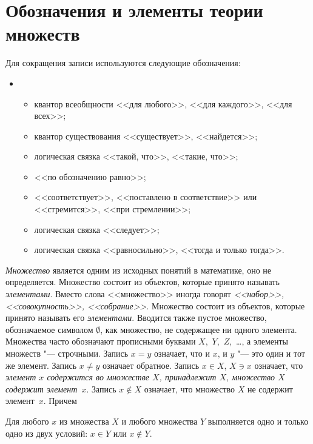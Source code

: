\chapter{Обозначения и элементы теории множеств}

Для сокращения записи используются следующие обозначения:
\begin{itemize}
\item[]
\begin{itemize}[noitemsep, label = ---]
\item \makebox[0pt][r]{$\forall$\hspace{0.75cm}}
квантор всеобщности <<для любого>>, <<для каждого>>, <<для всех>>;
\item \makebox[0pt][r]{$\exists$\hspace{0.75cm}}
квантор существования  <<существует>>, <<найдется>>;
\item \makebox[0pt][r]{$:$\hspace{0.75cm}}
логическая связка <<такой, что>>, <<такие, что>>;
\item \makebox[0pt][r]{$\triangleq$\hspace{0.75cm}} 
<<по обозначению равно>>;
\item \makebox[0pt][r]{$\to$\hspace{0.75cm}}
<<соответствует>>, <<поставлено в соответствие>> или <<стремится>>, <<при стремлении>>;
\item \makebox[0pt][r]{$\Rightarrow$\hspace{0.75cm}}
логическая связка <<следует>>;
\item \makebox[0pt][r]{$\Longleftrightarrow$\hspace{0.75cm}}
логическая связка <<равносильно>>, <<тогда и только тогда>>.
\end{itemize}
\end{itemize}

\textit{Множество} является одним из исходных понятий в математике, оно не определяется. Множество состоит из объектов, которые принято называть \textit{элементами}. Вместо слова <<множество>> иногда говорят \textit{<<набор>>, <<совокупность>>, <<собрание>>}. Множество состоит из объектов, которые принято называть его \textit{элементами}. Вводится также пустое множество, обозначаемое символом $\emptyset$, как множество, не содержащее ни одного элемента. Множества часто обозначают прописными буквами $X$,~$Y$,~$Z$,~\ldots, а элементы множеств "--- строчными.  Запись $x = y$ означает, что и $x$, и $y$ "--- это один и тот же элемент. Запись $x\neq y$ означает обратное. Запись $x\in X$, $X\ni x$ означает, что \textit{элемент $x$ содержится во множестве $X$, принадлежит $X$, множество $X$ содержит элемент~$x$}. Запись $x \notin X$ означает, что множество $X$ не содержит элемент~$x$. Причем
\begin{axiome}
Для любого $x$ из множества $X$ и любого множества $Y$ выполняется одно и только одно из двух условий: $x\in Y$ или $x\notin Y$.
\end{axiome}

